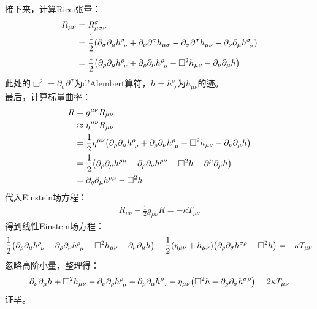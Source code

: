 \documentclass[a4paper]{article}
\begin{document}
\begin{enumerate}
{\[    \]
    接下来，计算Ricci张量：
    \begin{align*}
        R_{\mu\nu}
        &= R^\sigma_{\mu\sigma\nu} \\
        &= \frac{1}{2} \qty(\partial_\sigma \partial_\mu h^\sigma_{\ \nu} + \partial_\nu \partial^\sigma h_{\mu\sigma} - \partial_\sigma \partial^\sigma h_{\mu\nu} - \partial_\nu \partial_\mu h^\sigma_{\ \sigma}) \\
        &= \frac{1}{2} \qty(\partial_\rho \partial_\mu h^\rho_{\ \nu} + \partial_\rho \partial_\nu h^\rho_{\ \mu} - \Box^2 h_{\mu\nu} - \partial_\nu \partial_\mu h)
    \end{align*}
    此处的$\Box^2 = \partial_\sigma \partial^\sigma$为d'Alembert算符，$h = h^\sigma_{\ \sigma}$为$h_{\mu\nu}$的迹。 \\
    最后，计算标量曲率：
    \begin{align*}
        R
        &= g^{\mu\nu} R_{\mu\nu} \\
        &\approx \eta^{\mu\nu} R_{\mu\nu} \\
        &= \frac{1}{2} \eta^{\mu\nu} \qty(\partial_\rho \partial_\mu h^\rho_{\ \nu} + \partial_\rho \partial_\nu h^\rho_{\ \mu} - \Box^2 h_{\mu\nu} - \partial_\nu \partial_\mu h) \\
        &= \frac{1}{2} \qty(\partial_\rho \partial_\mu h^{\rho\mu} + \partial_\rho \partial_\nu h^{\rho\nu} - \Box^2 h - \partial^\mu \partial_\mu h) \\
        &= \partial_\rho \partial_\mu h^{\rho\mu} - \Box^2 h
    \end{align*}
    代入Einstein场方程：
    \begin{align*}
        R_{\mu\nu} - \frac{1}{2} g_{\mu\nu} R = -\kappa T_{\mu\nu}
    \end{align*}
    得到线性Einstein场方程：
    \[
        \frac{1}{2} \qty(\partial_\rho \partial_\mu h^\rho_{\ \nu} + \partial_\rho \partial_\nu h^\rho_{\ \mu} - \Box^2 h_{\mu\nu} - \partial_\nu \partial_\mu h) - \frac{1}{2} (\eta_{\mu\nu} + h_{\mu\nu}) \qty(\partial_\rho \partial_\sigma h^{\sigma\rho} - \Box^2 h) = -\kappa T_{\mu\nu}
    \]
    忽略高阶小量，整理得：
    \[
        \partial_\nu \partial_\mu h + \Box^2 h_{\mu\nu} - \partial_\nu \partial_\rho h^\rho_{\ \mu} - \partial_\rho \partial_\mu h^\rho_{\ \nu} - \eta_{\mu\nu} \qty(\Box^2 h - \partial_\rho \partial_\sigma h^{\sigma\rho}) = 2\kappa T_{\mu\nu}
    \]
    证毕。
    }

\end{enumerate}
\end{document}
